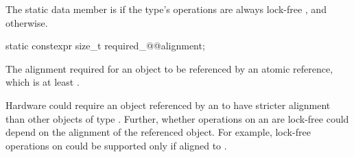 \begin{itemdescr}
\pnum
The static data member  is 
if the  type's operations are always lock-free
,
and  otherwise.
\end{itemdescr}

\begin{itemdecl}
static constexpr size_t required_@@alignment;
\end{itemdecl}

\begin{itemdescr}
\pnum
The alignment required for an object to be referenced  by an atomic reference,
which is at least .

\pnum
\begin{note}
Hardware could require an object
referenced by an 
to have stricter alignment
than other objects of type .
Further, whether operations on an 
are lock-free could depend on the alignment of the referenced object.
For example, lock-free operations on 
could be supported only if aligned to .
\end{note}
\end{itemdescr}


